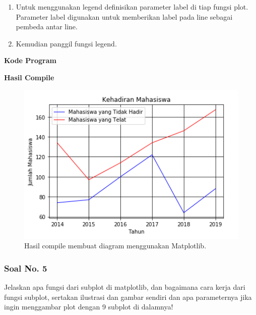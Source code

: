 \begin{enumerate}
	\item Untuk menggunakan legend definisikan parameter label di tiap fungsi plot. Parameter label digunakan untuk memberikan label pada line sebagai pembeda antar line.
	
	
	
	\item Kemudian panggil fungsi legend.
	
	
\end{enumerate}

\hfill \break
\textbf{Kode Program}



\hfill \break
\textbf{Hasil Compile}

\begin{figure}[H]
	\includegraphics[width=12cm]{figures/6/1174086/4.png}
	\centering
	\caption{Hasil compile membuat diagram menggunakan Matplotlib.}
\end{figure}

\subsubsection{Soal No. 5}
\hfill \break
Jelaskan apa fungsi dari subplot di matplotlib, dan bagaimana cara kerja dari fungsi subplot, sertakan ilustrasi dan gambar sendiri dan apa parameternya jika ingin menggambar plot dengan 9 subplot di dalamnya!

